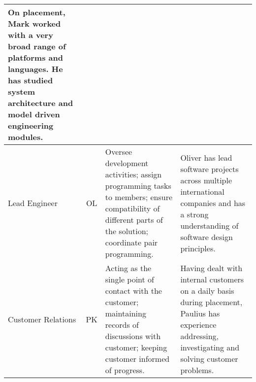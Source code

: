 \begin{table*}[h!]
\begin{tabularx}{\textwidth}{|p{1.6cm}|c|Y|Y|}
        On placement, Mark worked with a very broad range of platforms and languages. He has studied system architecture and model driven engineering modules.\\
        \hline
        Lead \phantom{11} Engineer & 
        OL & 
        Oversee development activities; assign programming tasks to members; ensure compatibility of different parts of the solution; coordinate pair programming. & 
        Oliver has lead software projects across multiple international companies and has a strong understanding of software design principles.\\
        \hline
        Customer Relations & 
        PK & 
        Acting as the single point of contact with the customer; maintaining records of discussions with customer; keeping customer informed of progress. & 
        Having dealt with internal customers on a daily basis during placement, Paulius has experience addressing, investigating and solving customer problems. \\
        \hline
        \end{tabularx}
    \end{table*}